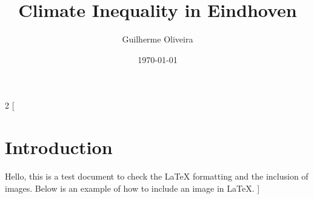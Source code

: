 \documentclass[12pt, a4paper]{article}
\title{Climate Inequality in Eindhoven}
\author{Guilherme Oliveira}
\date{\today}
\begin{document}
\maketitle
\begin{multicols}{2}
    [
    \section{Introduction}
    Hello, this is a test document to check the LaTeX formatting and the inclusion of images. Below is an example of how to include an image in LaTeX.
    ]
    \blindtext\blindtext
\end{multicols}
\end{document}
